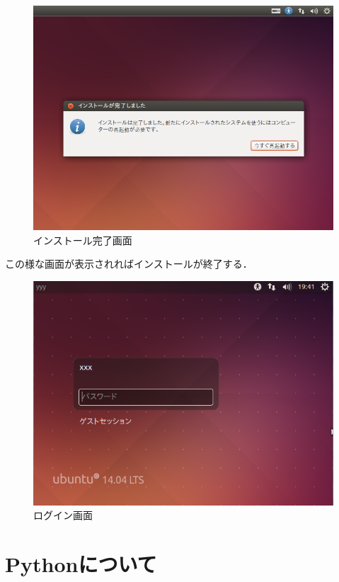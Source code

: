 \begin{figure}[htb]
\centering
\includegraphics[width=15cm]{ubuntuinstall7.png}
\caption{インストール完了画面}\label{イメージ画面}
\end{figure}
\clearpage
この様な画面が表示されればインストールが終了する．


\begin{figure}[htb]
\centering
\includegraphics[width=15cm]{ubuntuinstall8.png}
\caption{ログイン画面}\label{イメージ画面}
\end{figure}
\clearpage


\chapter{Pythonについて}

